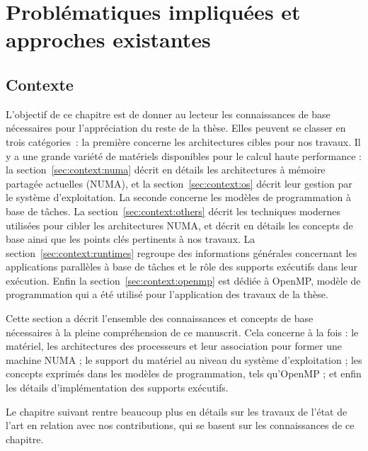 \part{Problématiques impliquées et approches existantes}

\chapter{Contexte}\label{chap:contexte}
\chaptertoc
\vfill

\pagebreak

L'objectif de ce chapitre est de donner au lecteur les connaissances de base nécessaires pour l'appréciation du reste de la thèse.
Elles peuvent se classer en trois catégories~: la première concerne les architectures cibles pour nos travaux. Il y a une grande variété de matériels disponibles pour le calcul haute performance : la section~\ref{sec:context:numa} décrit en détails les architectures à mémoire partagée actuelles (NUMA), et la section~\ref{sec:context:os} décrit leur gestion par le système d'exploitation.
La seconde concerne les modèles de programmation à base de tâches. La section~\ref{sec:context:others} décrit les techniques modernes utilisées pour cibler les architectures NUMA, et décrit en détails les concepts de base ainsi que les points clés pertinents à nos travaux.
La section~\ref{sec:context:runtimes} regroupe des informations générales concernant les applications parallèles à base de tâches et le rôle des supports exécutifs dans leur exécution.
Enfin la section~\ref{sec:context:openmp} est dédiée à OpenMP, modèle de programmation qui a été utilisé pour l'application des travaux de la thèse.







\bigskip

Cette section a décrit l'ensemble des connaissances et concepts de base nécessaires à la pleine compréhension de ce manuscrit.
Cela concerne à la fois : le matériel, les architectures des processeurs et leur association pour former une machine NUMA ; le support du matériel au niveau du système d'exploitation ; les concepts exprimés dans les modèles de programmation, tels qu'OpenMP ; et enfin les détails d'implémentation des supports exécutifs.

Le chapitre suivant rentre beaucoup plus en détails sur les travaux de l'état de l'art en relation avec nos contributions, qui se basent sur les connaissances de ce chapitre.
